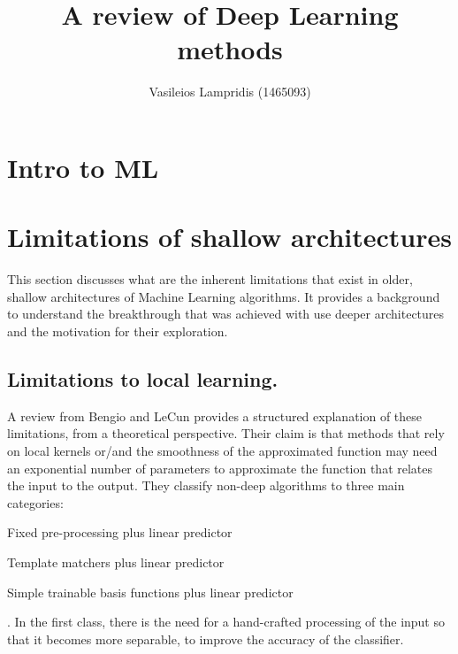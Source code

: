 \documentclass[a4paper]{report}
\author{Vasileios Lampridis	(1465093)}
\title{A review of Deep Learning methods}
\begin{document}
	
\tableofcontents
\listoffigures
\newpage

\maketitle

\begin{abstract}

\end{abstract}

\section{Intro to ML}
\section{Limitations of shallow architectures}
	This section discusses what are the inherent limitations that exist in older, shallow architectures of Machine Learning algorithms. It provides a background to understand the breakthrough that was achieved with use deeper architectures and the motivation for their exploration. 	
	\subsection{Limitations to local learning.}
		A review from Bengio and LeCun \cite{Bengio2007} provides a structured explanation of these limitations, from a theoretical perspective. Their claim is that methods that rely on local kernels or/and the smoothness of the approximated function may need an exponential number of parameters to approximate the function that relates the input to the output.
		They classify non-deep algorithms to three main categories: 
		\begin{enumerate*}
			\item Fixed pre-processing plus linear predictor		
			\item Template matchers plus linear predictor
			\item Simple trainable basis functions plus linear predictor
		\end{enumerate*}. 
		In the first class, there is the need for a hand-crafted processing of the input so that it becomes more separable, to improve the accuracy of the classifier. 
\end{document}
